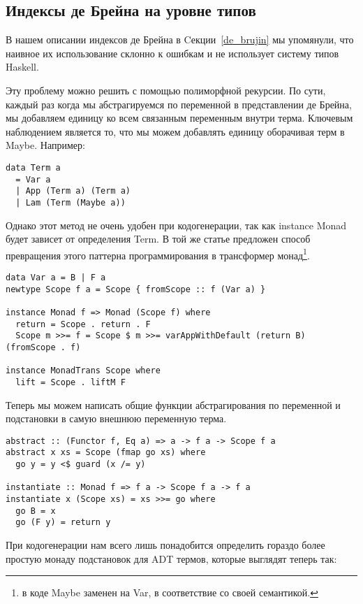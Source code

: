 \subsection{Индексы де Брейна на уровне типов}\label{de_brujin_impl}
В нашем описании индексов де Брейна в Cекции~\ref{de_brujin} мы упомянули, что наивное их использование склонно к ошибкам и не использует систему типов Haskell.

Эту проблему можно решить с помощью полиморфной рекурсии\cite{Bird:Pat}. По сути, каждый раз когда мы абстрагируемся по переменной в представлении де Брейна, мы добавляем единицу ко всем связанным переменным внутри терма. Ключевым наблюдением является то, что мы можем добавлять единицу оборачивая терм в Maybe. Например:

\begin{lstlisting}[frame=single]
data Term a
  = Var a
  | App (Term a) (Term a)
  | Lam (Term (Maybe a))
\end{lstlisting}

Однако этот метод не очень удобен при кодогенерации, так как instance Monad будет зависет от определения Term. В той же статье предложен способ превращения этого паттерна программирования в трансформер монад\footnote{в коде Maybe заменен на Var, в соответствие со своей семантикой.}.

\begin{lstlisting}[frame=single]
data Var a = B | F a
newtype Scope f a = Scope { fromScope :: f (Var a) }

instance Monad f => Monad (Scope f) where
  return = Scope . return . F
  Scope m >>= f = Scope $ m >>= varAppWithDefault (return B) (fromScope . f)

instance MonadTrans Scope where
  lift = Scope . liftM F

\end{lstlisting}

Теперь мы можем написать общие функции абстрагирования по переменной и подстановки в самую внешнюю переменную терма.

\begin{lstlisting}[frame=single]
abstract :: (Functor f, Eq a) => a -> f a -> Scope f a
abstract x xs = Scope (fmap go xs) where
  go y = y <$ guard (x /= y)

instantiate :: Monad f => f a -> Scope f a -> f a
instantiate x (Scope xs) = xs >>= go where
  go B = x
  go (F y) = return y

\end{lstlisting}

При кодогенерации нам всего лишь понадобится определить гораздо более простую монаду подстановок для ADT термов, которые выглядят теперь так:

